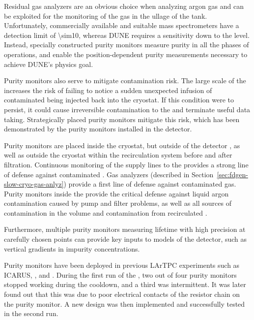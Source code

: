 Residual gas analyzers are an obvious choice when analyzing argon gas and can be exploited for the monitoring of the gas in the ullage of the tank. Unfortunately, commercially available and suitable mass spectrometers have a detection limit of \num{\sim10}, whereas DUNE requires a sensitivity down to the  level. Instead, specially constructed purity monitors measure \lar purity in all the phases of operations, and enable the position-dependent purity measurements necessary to achieve DUNE's physics goal. 

Purity monitors also serve to mitigate \lar contamination risk.  The large scale of the  increases the risk of failing to notice a sudden unexpected infusion of contaminated \lar being injected back into the cryostat.   
If this condition were to persist, it could cause irreversible contamination to the  and terminate useful data taking.  Strategically placed purity monitors mitigate this risk, which has been demonstrated by the purity monitors installed in the  detector.

Purity monitors are placed inside the cryostat, but outside of the detector , as well as outside the cryostat within the recirculation system before and after filtration. 
Continuous monitoring of  the  supply lines to the  provides a strong line of defense against contaminated \lar. Gas analyzers (described in Section~\ref{sec:fdgen-slow-cryo-gas-anlyz}) provide a first line of defense against contaminated gas.  Purity monitors inside the  provide the critical defense against liquid argon contamination caused by pump and filter problems, as well as all sources of contamination in the \lar volume and contamination from recirculated \lar. 

Furthermore, multiple purity monitors measuring lifetime with high precision at carefully chosen points can provide key inputs to  models of the detector, such as vertical gradients in impurity concentrations.

Purity monitors have been deployed in previous LArTPC experiments such as ICARUS, \microboone, and . During the first run of the , two out of four purity monitors stopped working during the cooldown, and a third was intermittent. It was later found out that this was due to poor electrical contacts of the resistor chain on the purity monitor. A new design was then implemented and successfully tested in the second run. 


